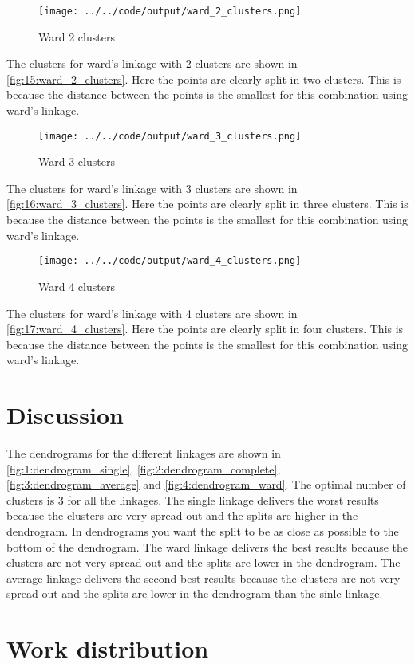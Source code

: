 \documentclass[twoside, a4paper, fleqn, reqno]{article}
\begin{document}
\begin{figure}[H]
	\centering
	\texttt{[image: ../../code/output/ward\_2\_clusters.png]}
	\caption{Ward 2 clusters}
	\label{fig:15:ward_2_clusters}
\end{figure}

The clusters for ward's linkage with 2 clusters are shown in \autoref{fig:15:ward_2_clusters}.
Here the points are clearly split in two clusters.
This is because the distance between the points is the smallest for this combination using ward's linkage.

\begin{figure}[H]
	\centering
	\texttt{[image: ../../code/output/ward\_3\_clusters.png]}
	\caption{Ward 3 clusters}
	\label{fig:16:ward_3_clusters}
\end{figure}

The clusters for ward's linkage with 3 clusters are shown in \autoref{fig:16:ward_3_clusters}.
Here the points are clearly split in three clusters.
This is because the distance between the points is the smallest for this combination using ward's linkage.

\begin{figure}[H]
	\centering
	\texttt{[image: ../../code/output/ward\_4\_clusters.png]}
	\caption{Ward 4 clusters}
	\label{fig:17:ward_4_clusters}
\end{figure}

The clusters for ward's linkage with 4 clusters are shown in \autoref{fig:17:ward_4_clusters}.
Here the points are clearly split in four clusters.
This is because the distance between the points is the smallest for this combination using ward's linkage.

\section{Discussion}

The dendrograms for the different linkages are shown in \autoref{fig:1:dendrogram_single}, \autoref{fig:2:dendrogram_complete}, \autoref{fig:3:dendrogram_average} and \autoref{fig:4:dendrogram_ward}.
The optimal number of clusters is 3 for all the linkages.
The single linkage delivers the worst results because the clusters are very spread out and the splits are higher in the dendrogram.
In dendrograms you want the split to be as close as possible to the bottom of the dendrogram.
The ward linkage delivers the best results because the clusters are not very spread out and the splits are lower in the dendrogram.
The average linkage delivers the second best results because the clusters are not very spread out and the splits are lower in the dendrogram than the sinle linkage.

\section{Work distribution}

\end{document}
